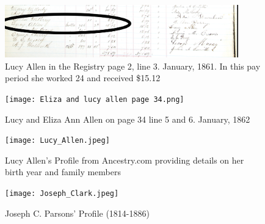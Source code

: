 \documentclass[
  letterpaper,
  DIV=11,
  numbers=noendperiod]{scrartcl}
\begin{document}
\begin{figure}

{\centering \includegraphics[width=0.9\textwidth,height=\textheight]{Lucypg2.png}

}

\caption{\label{fig-sample4}Lucy Allen in the Registry page 2, line 3.
January, 1861. In this pay period she worked 24 and received \$15.12}

\end{figure}

\begin{figure}

{\centering \texttt{[image: Eliza and lucy allen page 34.png]}

}

\caption{\label{fig-sample5}Lucy and Eliza Ann Allen on page 34 line 5
and 6. January, 1862}

\end{figure}

\begin{figure}

{\centering \texttt{[image: Lucy\_Allen.jpeg]}

}

\caption{\label{fig-sample6}Lucy Allen's Profile from Ancestry.com
providing details on her birth year and family members}

\end{figure}

\begin{figure}

{\centering \texttt{[image: Joseph\_Clark.jpeg]}

}

\caption{\label{fig-sample8}Joseph C. Parsons' Profile (1814-1886)}

\end{figure}

\clearpage
\end{document}
